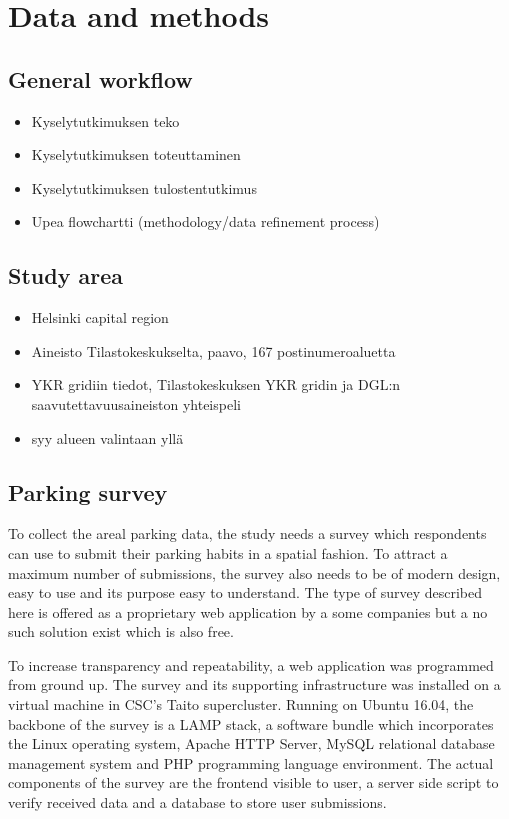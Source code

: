 \section{Data and methods}
\subsection{General workflow}
\justify
\begin{itemize}
    \item Kyselytutkimuksen teko
    \item Kyselytutkimuksen toteuttaminen
    \item Kyselytutkimuksen tulostentutkimus
    \item Upea flowchartti (methodology/data refinement process)
\end{itemize}

\subsection{Study area}
\justify
\begin{itemize}
    \item Helsinki capital region
    \item Aineisto Tilastokeskukselta, paavo, 167 postinumeroaluetta
    \item YKR gridiin tiedot, Tilastokeskuksen YKR gridin ja DGL:n saavutettavuusaineiston yhteispeli
    \item syy alueen valintaan yllä
\end{itemize}

\subsection{Parking survey}
\justify
To collect the areal parking data, the study needs a survey which respondents can use to submit their parking habits in a spatial fashion. To attract a maximum number of submissions, the survey also needs to be of modern design, easy to use and its purpose easy to understand. The type of survey described here is offered as a proprietary web application by a some companies but a no such solution exist which is also free. 

To increase transparency and repeatability, a web application was programmed from ground up. The survey and its supporting infrastructure was installed on a virtual machine in CSC's Taito supercluster. Running on Ubuntu 16.04, the backbone of the survey is a LAMP stack, a software bundle which incorporates the Linux operating system, Apache HTTP Server, MySQL relational database management system and PHP programming language environment. The actual components of the survey are the frontend visible to user, a server side script to verify received data and a database to store user submissions. 

